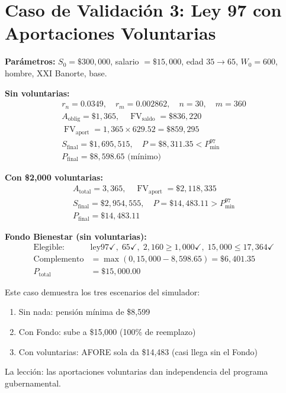 \documentclass[11pt,a4paper]{report}
\theoremstyle{remark}
\DeclareMathOperator{\FV}{FV}
\begin{document}
\section{Caso de Validaci\'on 3: Ley 97 con Aportaciones Voluntarias}

\begin{tcolorbox}[colback=blue!5!white, colframe=blue!75!black, title=\textbf{Definici\'on Formal}]
\textbf{Par\'ametros:} $S_0 = \$300{,}000$, salario $= \$15{,}000$, edad $35 \to 65$, $W_0 = 600$, hombre, XXI Banorte, base.

\textbf{Sin voluntarias:}
\begin{align}
r_n = 0.0349, \quad r_m = 0.002862, \quad n = 30, \quad m = 360 \\
A_{\text{oblig}} = \$1{,}365, \quad \FV_{\text{saldo}} = \$836{,}220 \\
\FV_{\text{aport}} = 1{,}365 \times 629.52 = \$859{,}295 \\
S_{\text{final}} = \$1{,}695{,}515, \quad P = \$8{,}311.35 < P_{\min}^{97} \\
P_{\text{final}} = \boxed{\$8{,}598.65 \text{ (m\'inimo)}}
\end{align}

\textbf{Con \$2,000 voluntarias:}
\begin{align}
A_{\text{total}} = 3{,}365, \quad \FV_{\text{aport}} = \$2{,}118{,}335 \\
S_{\text{final}} = \$2{,}954{,}555, \quad P = \$14{,}483.11 > P_{\min}^{97} \\
P_{\text{final}} = \boxed{\$14{,}483.11}
\end{align}

\textbf{Fondo Bienestar (sin voluntarias):}
\begin{align}
\text{Elegible:} \quad &\text{ley97} \checkmark, \; 65 \checkmark, \; 2{,}160 \geq 1{,}000 \checkmark, \; 15{,}000 \leq 17{,}364 \checkmark \\
\text{Complemento} &= \max(0, 15{,}000 - 8{,}598.65) = \$6{,}401.35 \\
P_{\text{total}} &= \$15{,}000.00
\end{align}
\end{tcolorbox}

\begin{tcolorbox}[colback=green!5!white, colframe=green!50!black, title=\textbf{Intuici\'on}]
Este caso demuestra los tres escenarios del simulador:
\begin{enumerate}
  \item Sin nada: pensi\'on m\'inima de \$8,599
  \item Con Fondo: sube a \$15,000 (100\% de reemplazo)
  \item Con voluntarias: AFORE sola da \$14,483 (casi llega sin el Fondo)
\end{enumerate}

La lecci\'on: las aportaciones voluntarias dan independencia del programa gubernamental.
\end{tcolorbox}
\end{document}
